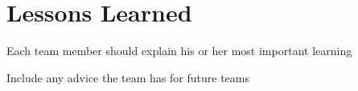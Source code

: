 \chapter{Lessons Learned}

Each team member should explain his or her most important learning

Include any advice the team has for future teams
